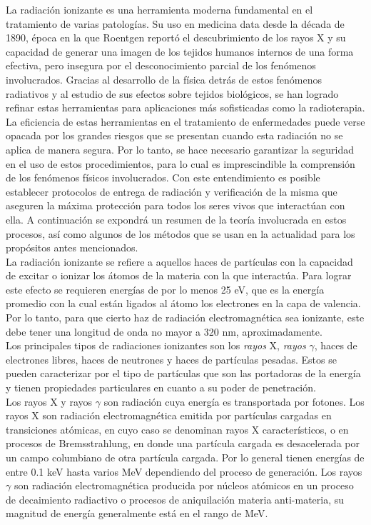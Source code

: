 La radiación ionizante es una herramienta moderna fundamental en el tratamiento de varias patologías. Su uso en medicina data desde la década de 1890, época en la que Roentgen reportó el descubrimiento de los rayos X y su capacidad de generar una imagen de los tejidos humanos internos de una forma efectiva, pero insegura por el desconocimiento parcial de los fenómenos involucrados. Gracias al desarrollo de la física detrás de estos fenómenos radiativos y al estudio de sus efectos sobre tejidos biológicos, se han logrado refinar estas herramientas para aplicaciones más sofisticadas como la radioterapia.\\

La eficiencia de estas herramientas en el tratamiento de enfermedades puede verse opacada por los grandes riesgos que se presentan cuando esta radiación no se aplica de manera segura. Por lo tanto, se hace necesario garantizar la seguridad en el uso de estos procedimientos, para lo cual es imprescindible la comprensión de los fenómenos físicos involucrados. Con este entendimiento es posible establecer protocolos de entrega de radiación y verificación de la misma que aseguren la máxima protección para todos los seres vivos que interactúan con ella. A continuación se expondrá un resumen de la teoría involucrada en estos procesos, así como algunos de los métodos que se usan en la actualidad para los propósitos antes mencionados.  \\

La radiación ionizante se refiere a aquellos haces de partículas con la capacidad de excitar o ionizar los átomos de la materia con la que interactúa. Para lograr este efecto se requieren energías de por lo menos 25 eV, que es la energía promedio con la cual están ligados al átomo los electrones en la capa de valencia. Por lo tanto, para que cierto haz de radiación electromagnética sea ionizante, este debe tener una longitud de onda no mayor a 320 nm, aproximadamente. \\

Los principales tipos de radiaciones ionizantes son los \textit{rayos} X, \textit{rayos }$\gamma$, haces de electrones libres, haces de neutrones y haces de partículas pesadas. Estos se pueden caracterizar por el tipo de partículas que son las portadoras de la energía y tienen propiedades particulares en cuanto a su poder de penetración.\\

Los rayos X y rayos $\gamma$ son radiación cuya energía es transportada por fotones. Los rayos X son radiación electromagnética emitida por partículas cargadas en transiciones atómicas, en cuyo caso se denominan rayos X característicos, o en procesos de Bremsstrahlung, en donde una partícula cargada es desacelerada por un campo columbiano de otra partícula cargada. Por lo general tienen energías de entre  0.1 keV hasta varios MeV dependiendo del proceso de generación. Los rayos $\gamma$ son radiación electromagnética producida por núcleos atómicos en un proceso de decaimiento radiactivo o procesos de aniquilación materia anti-materia, su magnitud de energía generalmente está en el rango de MeV.\\

